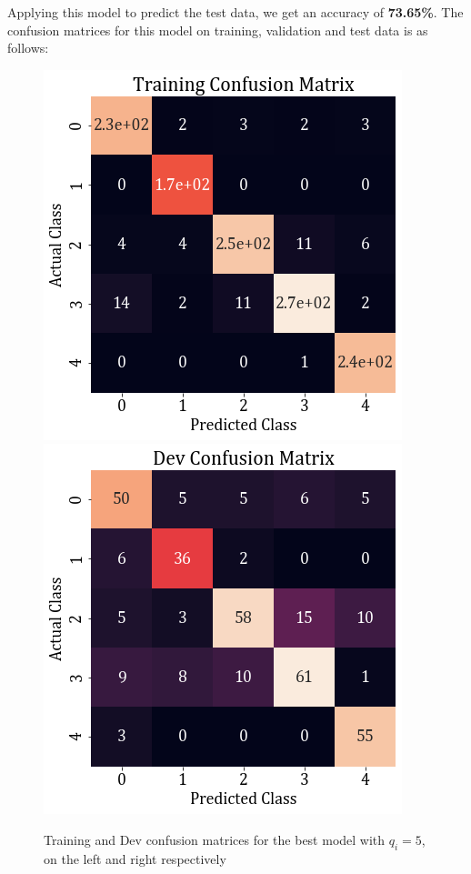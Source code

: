 \documentclass[11pt,a4paper]{article}
\newcommand{\noi}{\noindent}
\begin{document}
\noi
Applying this model to predict the test data, we get an accuracy of \textbf{73.65\%}. The confusion matrices for this model on training, validation and test data is as follows:
\begin{figure}[H]
    \centering
    \includegraphics[scale=0.55]{images/2B/2B_diag_train_conf.png}
    \includegraphics[scale=0.55]{images/2B/2B_diag_dev_conf.png}
    \caption{Training and Dev confusion matrices for the best model with $q_i=5$, on the left and right respectively}
\end{figure}
\end{document}
